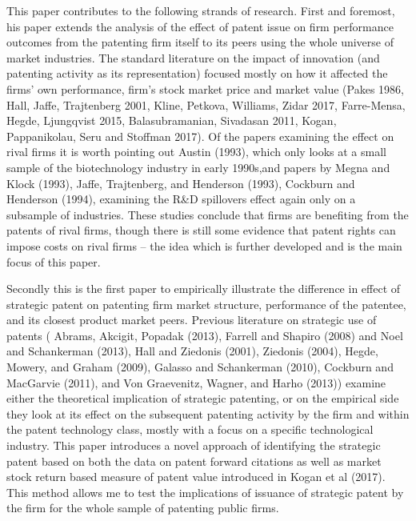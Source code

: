 \documentclass[11pt]{article}
\begin{document}
This paper contributes to the following strands of research. First and foremost, his paper extends the analysis of the effect of patent issue on firm performance outcomes from the patenting firm itself to its peers using the whole universe of market industries. The standard literature on the impact of innovation (and patenting activity as its representation) focused mostly on how it affected the firms' own performance, firm's stock market price and market value \color{blue}(Pakes 1986, Hall, Jaffe, Trajtenberg 2001, Kline, Petkova, Williams, Zidar 2017, Farre-Mensa, Hegde, Ljungqvist 2015, Balasubramanian, Sivadasan 2011, Kogan, Pappanikolau, Seru and Stoffman 2017)\color{black}. Of the papers examining the effect on rival firms it is worth pointing out \color{blue}Austin (1993)\color{black}, which only looks at a small sample of the biotechnology industry in early 1990s,and papers by \color{blue} Megna and Klock (1993), Jaffe, Trajtenberg, and Henderson (1993), Cockburn and Henderson (1994)\color{black}, examining the R\&D spillovers effect again only on a subsample of industries. These studies conclude that firms are benefiting from the patents of rival firms, though there is still some evidence that patent rights can impose costs on rival firms -- the idea which is further developed and is the main focus of this paper. 

Secondly this is the first paper to empirically illustrate the difference in effect of strategic patent on patenting firm market structure, performance of the patentee, and its closest product market peers. Previous literature on strategic use of patents (\color{blue} Abrams, Akcigit, Popadak (2013), Farrell and Shapiro (2008) and Noel and Schankerman (2013), Hall and Ziedonis (2001), Ziedonis (2004), Hegde, Mowery, and Graham (2009), Galasso and Schankerman (2010), Cockburn and MacGarvie (2011), and Von Graevenitz, Wagner, and Harho (2013)\color{black}) examine either the theoretical implication of strategic patenting, or on the empirical side they look at its effect on the subsequent patenting activity by the firm and within the patent technology class, mostly with a focus on a specific technological industry. This paper introduces a novel approach of identifying the strategic patent based on both the data on patent forward citations as well as market stock return based measure of patent value introduced in \color{blue} Kogan et al (2017)\color{black}. This method allows me to test the implications of issuance of strategic patent by the firm for the whole sample of patenting public firms.   
\end{document}
